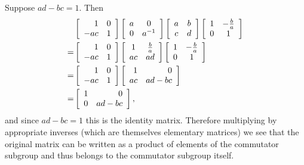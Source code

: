 \documentclass{article}
\begin{document}
\begin{Answer}
\begin{enumerate}[(a)]
{      Suppose $ad - bc = 1$. Then
      \begin{align*}
       &\left[\begin{array}{r r}
          1   & 0 \\
          -ac & 1
        \end{array}\right]
        \left[\begin{array}{c c}
          a & 0     \\
          0 & a^{-1}
        \end{array}\right]
        \left[\begin{array}{c c}
          a & b \\ c & d
        \end{array}\right]
        \left[\begin{array}{c c}
          1 & -\frac{b}{a} \\
          0 & 1
        \end{array}\right] \\
      =&
        \left[\begin{array}{r r}
          1   & 0 \\
          -ac & 1
        \end{array}\right]
        \left[\begin{array}{c c}
          1 & \frac{b}{a} \\ ac & ad
        \end{array}\right]
        \left[\begin{array}{c c}
          1 & -\frac{b}{a} \\
          0 & 1
        \end{array}\right] \\
      =&\left[\begin{array}{r r}
          1   & 0 \\
          -ac & 1
        \end{array}\right]
        \left[\begin{array}{r r}
          1 & 0 \\ ac & ad - bc
        \end{array}\right] \\
      =&
        \left[\begin{array}{r r}
          1 & 0 \\ 0 & ad - bc
        \end{array}\right],
      \end{align*}
      and since $ad - bc = 1$ this is the identity matrix. Therefore
      multiplying by appropriate inverses (which are themselves
      elementary matrices) we see that the original matrix can be
      written as a product of elements of the commutator subgroup and
      thus belongs to the commutator subgroup itself.

}
\end{enumerate}
\end{Answer}
\end{document}

